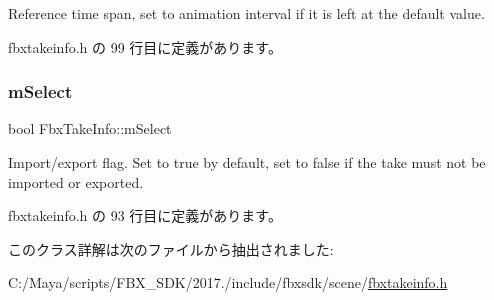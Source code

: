 Reference time span, set to animation interval if it is left at the default value. 



 fbxtakeinfo.\+h の 99 行目に定義があります。

\mbox{\label{class_fbx_take_info_a0e239e6f052b3d5cbccbeb85669d9a63}} 
\subsubsection{\texorpdfstring{m\+Select}{mSelect}}
{\footnotesize\ttfamily bool Fbx\+Take\+Info\+::m\+Select}

Import/export flag. Set to {\ttfamily true} by default, set to {\ttfamily false} if the take must not be imported or exported. 

 fbxtakeinfo.\+h の 93 行目に定義があります。



このクラス詳解は次のファイルから抽出されました\+:\begin{DoxyCompactItemize}
\item 
C\+:/\+Maya/scripts/\+F\+B\+X\+\_\+\+S\+D\+K/2017./include/fbxsdk/scene/\hyperlink{fbxtakeinfo_8h}{fbxtakeinfo.\+h}\end{DoxyCompactItemize}
